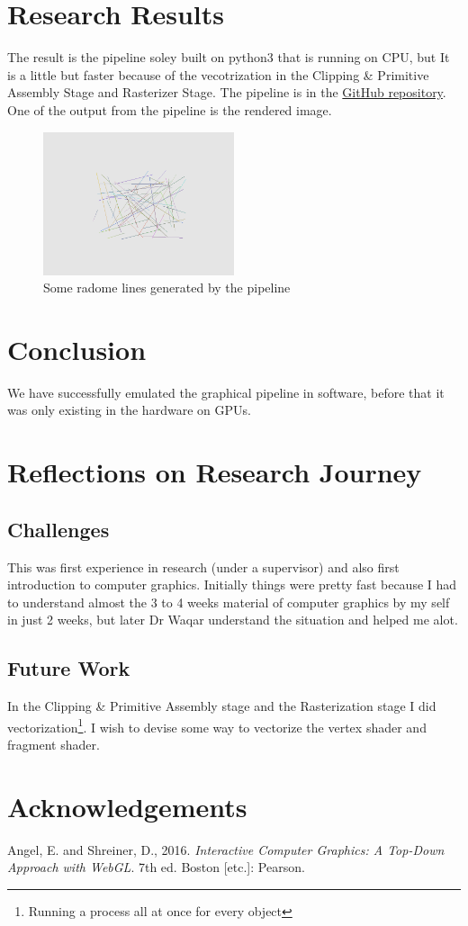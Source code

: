 \documentclass[a4paper]{article}
\theoremstyle{mytheoremstyle}
\theoremstyle{mytheoremstyle}
\theoremstyle{myproblemstyle}
\begin{document}
\section{Research Results}
The result is the pipeline soley built on python3 that is running on CPU, but It is a little but faster because of the vecotrization in the Clipping \& Primitive Assembly Stage and Rasterizer Stage. The pipeline is in the \href{https://GitHub.com/ai-maq/Computer-Graphics-Tehqiq/}{GitHub repository}. One of the output from the pipeline is the rendered image.

\begin{figure}[h]
    \center
    \includegraphics[width=0.5\textwidth]{first_output.png}
    \caption{Some radome lines generated by the pipeline}
\end{figure}


\section{Conclusion}
We have successfully emulated the graphical pipeline in software, before that it was only existing in the hardware on GPUs.

\section{Reflections on Research Journey}
\subsection{Challenges}
This was first experience in research (under a supervisor) and also first introduction to computer graphics. Initially things were pretty fast because I had to understand almost the 3 to 4 weeks material of computer graphics by my self in just 2 weeks, but later Dr Waqar understand the situation and helped me alot.

\subsection{Future Work}
In the Clipping \& Primitive Assembly stage and the Rasterization stage I did vectorization\footnote{Running a process all at once for every object}. I wish to devise some way to vectorize the vertex shader and fragment shader.

\section{Acknowledgements}
\begin{thebibliography}{9}
    Angel, E. and Shreiner, D., 2016. \emph{Interactive Computer Graphics: A Top-Down Approach with WebGL}. 7th ed. Boston [etc.]: Pearson.
\end{thebibliography}
\end{document}
